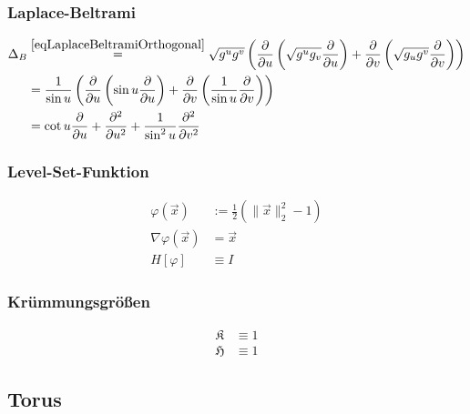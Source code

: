     \subsubsection{Laplace-Beltrami}
      \begin{align}
        \Delta_{B} &\overset{\eqref{eqLaplaceBeltramiOrthogonal}}{=} \sqrt{g^{u}g^{v}} 
                      \left(  \frac{\partial}{\partial u} 
                             \left( \sqrt{g^{u}g_{v}} \frac{\partial}{\partial u} \right) 
                                  + \frac{\partial}{\partial v} \left( \sqrt{g_{u}g^{v}} \frac{\partial}{\partial v} 
                       \right) \right) \\
                   &= \frac{1}{\sin u}
                      \left(  \frac{\partial}{\partial u} 
                             \left( \sin u \frac{\partial}{\partial u} \right) 
                                  + \frac{\partial}{\partial v} \left( \frac{1}{\sin u} \frac{\partial}{\partial v} 
                       \right) \right) \\
                   &= \cot u \frac{\partial}{\partial u} 
                        + \frac{\partial^{2}}{\partial u^{2}}
                        + \frac{1}{\sin^{2} u} \frac{\partial^{2}}{\partial v^{2}}
      \end{align}

    \subsubsection{Level-Set-Funktion}
      \begin{align}
        \varphi(\vec{x}) &:= \frac{1}{2}\left( \|\vec{x}\|_{2}^{2} - 1 \right) \\
        \nabla\varphi(\vec{x}) &= \vec{x} \\
        H[\varphi] &\equiv I
      \end{align}

     \subsubsection{Krümmungsgrößen}
      \begin{align}
        \mathfrak{K} &\equiv 1 \\
        \mathfrak{H} &\equiv 1
      \end{align}

  \subsection{Torus}
  \label{torus}

